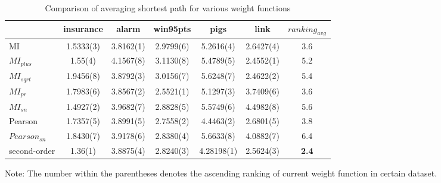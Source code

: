 \begin{table}[th]
\begin{center}
\caption{\label{tab:shortestPath}Comparison of averaging shortest path for various weight functions}
\small
\begin{tabular}{|l|cccccc|}
\hline
 & insurance & alarm & win95pts & pigs & link & $ranking_{avg}$ \\
\hline
MI            & 1.5333(3) & 3.8162(1) & 2.9799(6) & 5.2616(4) & 2.6427(4) & 3.6 \\
$MI_{plus}$   & 1.55(4)   & 4.1567(8) & 3.1130(8) & 5.4789(5) & 2.4552(1) & 5.2 \\
$MI_{sqrt}$   & 1.9456(8) & 3.8792(3) & 3.0156(7) & 5.6248(7) & 2.4622(2) & 5.4 \\
$MI_{pr}$     & 1.7983(6) & 3.8567(2) & 2.5521(1) & 5.1297(3) & 3.7409(6) & 3.6 \\
$MI_{sn}$     & 1.4927(2) & 3.9682(7) & 2.8828(5) & 5.5749(6) & 4.4982(8) & 5.6 \\
Pearson       & 1.7357(5) & 3.8991(5) & 2.7558(2) & 4.4463(2) & 2.6801(5) & 3.8 \\
$Pearson_{sn}$& 1.8430(7) & 3.9178(6) & 2.8380(4) & 5.6633(8) & 4.0882(7) & 6.4\\
second-order& 1.36(1)   & 3.8875(4) & 2.8240(3) & 4.28198(1)& 2.5624(3) & \textbf{2.4}\\
\hline
\end{tabular}

Note: The number within the parentheses denotes the ascending ranking of current weight function in certain dataset.

\end{center}
\end{table}

